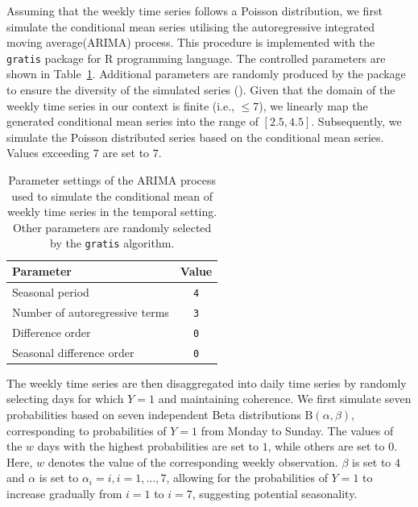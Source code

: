 \documentclass[a4paper,review,12pt,authoryear]{elsarticle}
\let\code=\texttt
\let\proglang=\textsf
\begin{document}
     Assuming that the weekly time series follows a Poisson distribution, we first simulate the conditional mean series utilising the autoregressive integrated moving average(ARIMA) process. This procedure is implemented with the \code{gratis} package \citep{gratis}
     for \proglang{R} programming language.
     The controlled parameters are shown in Table~\ref{tab:parameters}. Additional parameters are randomly produced by the package to ensure the diversity of the simulated series ().
     Given that the domain of the weekly time series in our context is finite (i.e., $\leq 7$), we linearly map the generated conditional mean series into the range of $[2.5, 4.5]$.
     Subsequently, we simulate the Poisson distributed series based on the conditional mean series. Values exceeding $7$ are set to $7$.

     \begin{table}[h]
       \centering
       \caption{\label{tab:parameters} Parameter settings of the ARIMA process used to simulate the conditional mean of weekly time series in the temporal setting. Other parameters are randomly selected by the \texttt{gratis} algorithm.}
       \begin{tabular}{lc}
         \toprule
         Parameter & Value \\ \midrule
         Seasonal period & \texttt{4} \\
         Number of autoregressive terms & \texttt{3} \\
         Difference order & \texttt{0} \\
         Seasonal difference order & \texttt{0} \\ \bottomrule
       \end{tabular}
     \end{table}

     The weekly time series are then disaggregated into daily time series by randomly selecting days for which $Y=1$ and maintaining coherence.
     We first simulate seven probabilities based on seven independent Beta distributions $\textrm{B}(\alpha, \beta)$, corresponding to probabilities of $Y=1$ from Monday to Sunday.
     The values of the $w$ days with the highest probabilities are set to $1$, while others are set to $0$. Here, $w$ denotes the value of the corresponding weekly observation.
     $\beta$ is set to $4$ and $\alpha$ is set to $\alpha_i = i, i=1,\dots,7$, allowing for the probabilities of $Y=1$ to increase gradually from $i=1$ to $i=7$, suggesting potential seasonality.
\end{document}
